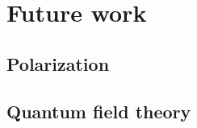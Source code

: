 \chapter{\label{ch:future}Future work}

\section{Polarization}
\section{Quantum field theory}

%

\endinput %